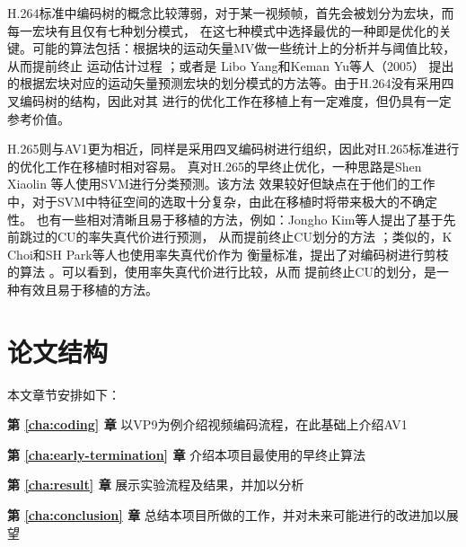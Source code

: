 H.264标准中编码树的概念比较薄弱，对于某一视频帧，首先会被划分为宏块，而每一宏块有且仅有七种划分模式，
在这七种模式中选择最优的一种即是优化的关键。可能的算法包括：根据块的运动矢量MV做一些统计上的分析并与阈值比较，从而提前终止
运动估计过程 \cite{xu2003efficient} ；或者是 Libo Yang和Keman Yu等人（2005）\cite{yang2005effective}
提出的根据宏块对应的运动矢量预测宏块的划分模式的方法等。由于H.264没有采用四叉编码树的结构，因此对其
进行的优化工作在移植上有一定难度，但仍具有一定参考价值。

H.265则与AV1更为相近，同样是采用四叉编码树进行组织，因此对H.265标准进行的优化工作在移植时相对容易。
真对H.265的早终止优化，一种思路是Shen Xiaolin 等人使用SVM进行分类预测\cite{shen2013cu}。该方法
效果较好但缺点在于他们的工作中，对于SVM中特征空间的选取十分复杂，由此在移植时将带来极大的不确定性。
也有一些相对清晰且易于移植的方法，例如：Jongho Kim等人提出了基于先前跳过的CU的率失真代价进行预测，
从而提前终止CU划分的方法 \cite{kim2012adaptive}；类似的，K Choi和SH Park等人也使用率失真代价作为
衡量标准，提出了对编码树进行剪枝的算法 \cite{choi2011coding}。可以看到，使用率失真代价进行比较，从而
提前终止CU的划分，是一种有效且易于移植的方法。

\section{论文结构}

本文章节安排如下：

\textbf{第 \ref{cha:coding} 章} \; 以VP9为例介绍视频编码流程，在此基础上介绍AV1

\textbf{第 \ref{cha:early-termination} 章} \; 介绍本项目最使用的早终止算法 

\textbf{第 \ref{cha:result} 章} \; 展示实验流程及结果，并加以分析

\textbf{第 \ref{cha:conclusion} 章} \; 总结本项目所做的工作，并对未来可能进行的改进加以展望